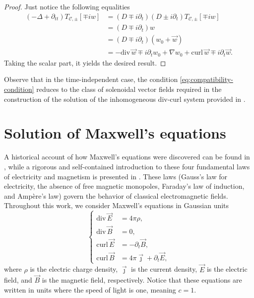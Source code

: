 \documentclass[12pt]{article}
\def\div{\mbox{div}\,}
\def\curl{\mbox{curl}\,}
\begin{document}
\begin{proof}
Just notice the following equalities
    \begin{align*}
        (-\Delta+\partial_{tt}) T_{\mathscr{C},\pm}[{\mp iw}]&=(D\mp i\partial_t) (D\pm i\partial_t) T_{\mathscr{C},\pm}[{\mp iw}]\\
        &=(D\mp i\partial_t)w\\
        &=(D\mp i\partial_t)(w_0+\vec{w})\\
        &=-\div{\vec w}\mp i\partial_t w_0+\nabla w_0+\curl{\vec w}\mp i\partial_t\vec w.
    \end{align*}
Taking the scalar part, it yields the desired result.
\end{proof}
Observe that in the time-independent case, the condition \eqref{eq:compatibility-condition} reduces to the class of solenoidal vector fields \cite[Prop. 3.1]{DelPor2017} required in the construction of the solution of the inhomogeneous div-curl system provided in \cite{DelPor2017}.


\section{Solution of Maxwell's equations} \label{sec:rel_maxwell_equations}
A historical account of how Maxwell's equations were discovered can be found in \cite{huray2009maxwell,shapiro1973history}, while a rigorous and self-contained introduction to these four fundamental laws of electricity and magnetism is presented in \cite{jackson1977classical}. These laws (Gauss's law for electricity, the absence of free magnetic monopoles, Faraday's law of induction, and Ampère's law) govern the behavior of classical electromagnetic fields. Throughout this work, we consider Maxwell's equations in Gaussian units
\begin{equation}\label{eq:Maxwell}
    \begin{cases}
        \div\vec{E}&=4\pi\rho,\\
        \div\vec{B}&=0,\\
        \curl\vec{E}&=-\partial_t\vec{B},\\
        \curl\vec{B}&=4\pi\vec{\jmath}+\partial_t\vec{E},
    \end{cases}
\end{equation}
where $\rho$ is the electric charge density, $\vec\jmath$ is the current density, $\vec{E}$ is the electric field, and $\vec B$ is the magnetic field, respectively. Notice that these equations are written in units where the speed of light is one, meaning $c=1.$
\end{document}
